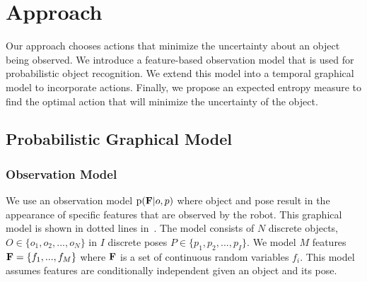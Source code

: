     \vspace{-0.5ex}
\section{Approach}
    \vspace{-0.5ex}


Our approach chooses actions that minimize the uncertainty about an object being observed. We introduce a feature-based observation model that is used for probabilistic object recognition. We extend this model into a temporal graphical model to incorporate actions. Finally, we propose an expected entropy measure to find the optimal action that will minimize the uncertainty of the object.
\vspace{-1ex}
    \subsection{Probabilistic Graphical Model}
    \vspace{-0.5ex}
            
        \subsubsection{Observation Model}
            We use an observation model $\text{p}(\mathbf{F}|o,p)$ where object and pose result in the appearance of specific features that are observed by the robot. This graphical model is shown in dotted lines in~. The model consists of $N$ discrete objects, $O \in \{o_1,o_2, ..., o_N\}$ in $I$ discrete poses $P \in \{p_1,p_2, ..., p_I\}$. We model $M$ features $\mathbf{F} = \left\{ f_1, ...,  f_M\right\}$ where $\mathbf{F}$ is a set of continuous random variables $f_i$. This model assumes features are conditionally independent given an object and its pose. 

